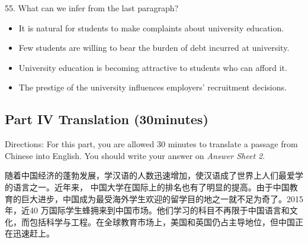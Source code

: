 \documentclass[UTF8,11pt]{ctexart}
\begin{document}
55. What can we infer from the last paragraph?


\begin{itemize}[leftmargin=2em,itemsep=.2em,topsep=.4em]\item[A.] It is natural for students to make complaints about university education.
\item[B.] Few students are willing to bear the burden of debt incurred at university.
\item[C.] University education is becoming attractive to students who can afford it.
\item[D.] The prestige of the university influences employers’ recruitment decisions.
\end{itemize}

\subsection*{Part IV Translation (30minutes)}


Directions: For this part, you are allowed 30 minutes to translate a passage from Chinese into English. You should write your answer on\textit{ Answer Sheet 2}.


随着中国经济的蓬勃发展，学汉语的人数迅速增加，使汉语成了世界上人们最爱学的语言之一。近年来， 中国大学在国际上的排名也有了明显的提高。由于中国教育的巨大进步，中国成为最受海外学生欢迎的留学目的地之一就不足为奇了。2015 年，近40 万国际学生蜂拥来到中国市场。他们学习的科目不再限于中国语言和文化，而包括科学与工程。在全球教育市场上，美国和英国仍占主导地位，但中国正在迅速赶上。
\end{document}
